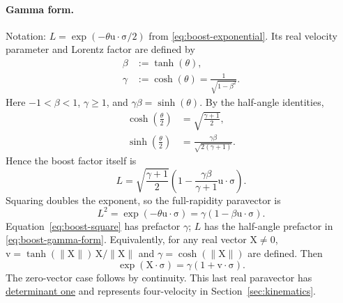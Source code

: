 \documentclass[11pt]{article}
\newcommand{\pv}[1]{{#1}}
\newcommand{\vstyle}[1]{{\bm{\mathrm{#1}}}}
\newcommand{\pL}{\pv{L}}
\numberwithin{equation}{section}
\newcommand{\dotprod}{\cdot}
\newcommand{\bsig}{\vstyle{\sigma}}
\newcommand{\bX}{\vstyle{X}}
\newcommand{\bv}{\vstyle{v}}
\newcommand{\bu}{\vstyle{u}}
\begin{document}
\paragraph{Gamma form.}
Notation: $\pL=\exp(-\theta\bu\dotprod\bsig/2)$ from
\eqref{eq:boost-exponential}.  Its real velocity parameter and
Lorentz factor are defined by
\begin{align*}
 \beta&:=\tanh(\theta),
 \\
 \gamma&:=\cosh(\theta)=\frac1{\sqrt{1-\beta^2}}.
\end{align*}
Here $-1<\beta<1$, $\gamma\ge1$, and $\gamma\beta=\sinh(\theta)$.
By the half-angle identities,
\begin{align*}
 \cosh\left(\frac\theta2\right)&=\sqrt{\frac{\gamma+1}{2}},\\
 \sinh\left(\frac\theta2\right)&=\frac{\gamma\beta}{\sqrt{2(\gamma+1)}}.
\end{align*}
Hence the boost factor itself is
\begin{equation}
 \pL=\sqrt{\frac{\gamma+1}{2}}
 \left(1-\frac{\gamma\beta}{\gamma+1}\bu\dotprod\bsig\right).
 \label{eq:boost-gamma-form}
\end{equation}
Squaring doubles the exponent, so the full-rapidity paravector is
\begin{equation}
 \pL^2=\exp(-\theta\bu\dotprod\bsig)
 =\gamma(1-\beta\bu\dotprod\bsig).
 \label{eq:boost-square}
\end{equation}
Equation~\eqref{eq:boost-square} has prefactor $\gamma$; $\pL$ has the half-angle
prefactor in \eqref{eq:boost-gamma-form}.  Equivalently, for any real vector
$\bX\ne0$, $\bv=\tanh(\lVert\bX\rVert)\,\bX/\lVert\bX\rVert$ and
$\gamma=\cosh(\lVert\bX\rVert)$ are defined.  Then
\[
 \exp(\bX\dotprod\bsig)=\gamma(1+\bv\dotprod\bsig).
\]
The zero-vector case follows by continuity.  This last real paravector has
\hyperref[eq:unit-determinant-paravector]{determinant one} and represents four-velocity in
Section~\ref{sec:kinematics}.
\end{document}

